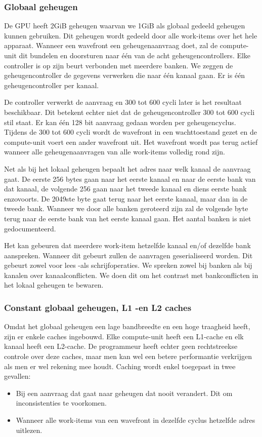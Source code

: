 \subsubsection{Globaal geheugen}
De GPU heeft 2GiB geheugen waarvan we 1GiB als globaal gedeeld geheugen kunnen gebruiken. Dit geheugen wordt gedeeld door alle work-items over het hele apparaat. Wanneer een wavefront een geheugenaanvraag doet, zal de compute-unit dit bundelen en doorsturen naar \'e\'en van de acht geheugencontrollers. Elke controller is op zijn beurt verbonden met meerdere banken. We zeggen de geheugencontroller de gegevens verwerken die naar \'e\'en kanaal gaan. Er is \'e\'en geheugencontroller per kanaal.

De controller verwerkt de aanvraag en 300 tot 600 cycli later is het resultaat beschikbaar. Dit betekent echter niet dat de geheugencontroller 300 tot 600 cycli stil staat. Er kan \'e\'en 128 bit aanvraag gedaan worden per geheugencyclus. Tijdens de 300 tot 600 cycli wordt de wavefront in een wachttoestand gezet en de compute-unit voert een ander wavefront uit. Het wavefront wordt pas terug actief wanneer alle geheugenaanvragen van alle work-items volledig rond zijn.

Net als bij het lokaal geheugen bepaalt het adres naar welk kanaal de aanvraag gaat. De eerste 256 bytes gaan naar het eerste kanaal en naar de eerste bank van dat kanaal, de volgende 256 gaan naar het tweede kanaal en diens eerste bank enzovoorts. De 2049ste byte gaat terug naar het eerste kanaal, maar dan in de tweede bank. Wanneer we door alle banken geroteerd zijn zal de volgende byte terug naar de eerste bank van het eerste kanaal gaan. Het aantal banken is niet gedocumenteerd.

Het kan gebeuren dat meerdere work-item hetzelfde kanaal en/of dezelfde bank aanspreken. Wanneer dit gebeurt zullen de aanvragen geserialiseerd worden. Dit gebeurt zowel voor lees -als schrijfoperaties. We spreken zowel bij banken als bij kanalen over kanaalconflicten. We doen dit om het contrast met bankconflicten in het lokaal geheugen te bewaren.




\subsubsection{Constant globaal geheugen, L1 -en L2 caches}
Omdat het globaal geheugen een lage bandbreedte en een hoge traagheid heeft, zijn er enkele caches ingebouwd. Elke compute-unit heeft een L1-cache en elk kanaal heeft een L2-cache. De programmeur heeft echter geen rechtstreekse controle over deze caches, maar men kan wel een betere performantie verkrijgen als men er wel rekening mee houdt. Caching wordt enkel toegepast in twee gevallen:
\begin{itemize}
    \item Bij een aanvraag dat gaat naar geheugen dat nooit verandert. Dit om inconsistenties te voorkomen.
    \item Wanneer alle work-items van een wavefront in dezelfde cyclus hetzelfde adres uitlezen.
\end{itemize} 

